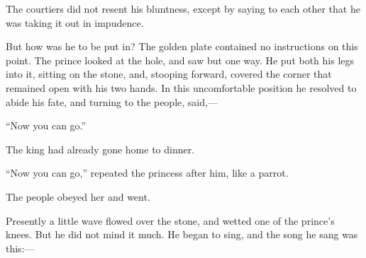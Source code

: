 \documentclass[12pt]{memoir}
\begin{document}
The courtiers did not resent his bluntness, except by saying to each
other that he was taking it out in impudence.

But how was he to be put in?  The golden plate contained no
instructions on this point.  The prince looked at the hole, and saw
but one way.  He put both his legs into it, sitting on the stone, and,
stooping forward, covered the corner that remained open with his two
hands.  In this uncomfortable position he resolved to abide his fate,
and turning to the people, said,---

``Now you can go.''

The king had already gone home to dinner.

``Now you can go,'' repeated the princess after him, like a parrot.

The people obeyed her and went.

Presently a little wave flowed over the stone, and wetted one of the
prince's knees.  But he did not mind it much.  He began to sing, and
the song he sang was this:---
\end{document}
